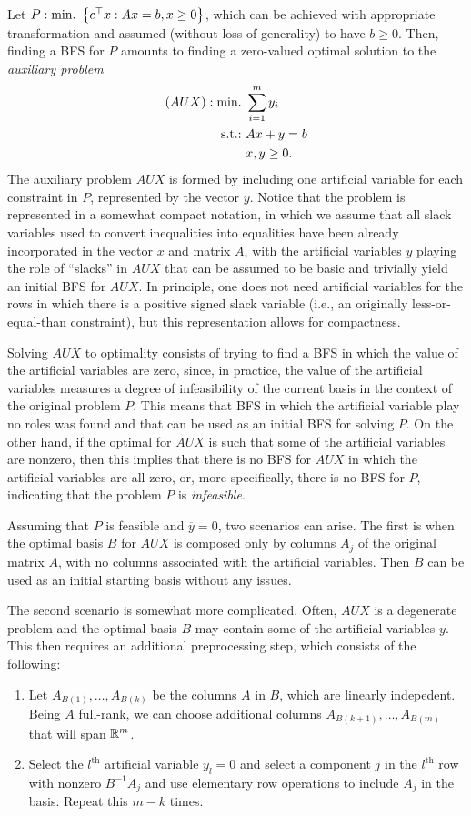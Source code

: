 Let $P : \mathop{\text{min.~}}\left\{ c^\top x : Ax = b, x \geq 0 \right \}$, which can be achieved with appropriate transformation and assumed (without loss of generality) to have $b \geq 0$. Then, finding a BFS for $P$ amounts to finding a zero-valued optimal solution to the \emph{auxiliary problem}
%
\begin{align*}
	(AUX) : \mathop{\text{min.~}} &\sum_{i=1}^m y_i \\
	\mathop{\text{s.t.:~}} & Ax + y = b \\
	    & x,y \geq 0.	
\end{align*}
%
The auxiliary problem $AUX$ is formed by including one artificial variable for each constraint in $P$, represented by the vector $y$. Notice that the problem is represented in a somewhat compact notation, in which we assume that all slack variables used to convert inequalities into equalities have been already incorporated in the vector $x$ and matrix $A$, with the artificial variables $y$ playing the role of ``slacks'' in $AUX$ that can be assumed to be basic and trivially yield an initial BFS for $AUX$. In principle, one does not need artificial variables for the rows in which there is a positive signed slack variable (i.e., an originally less-or-equal-than constraint), but this representation allows for compactness. 

Solving $AUX$ to optimality consists of trying to find a BFS in which the value of the artificial variables are zero, since, in practice, the value of the artificial variables measures a degree of infeasibility of the current basis in the context of the original problem $P$. This means that BFS in which the artificial variable play no roles was found and that can be used as an initial BFS for solving $P$. On the other hand, if the optimal for $AUX$ is such that some of the artificial variables are nonzero, then this implies that there is no BFS for $AUX$ in which the artificial variables are all zero, or, more specifically, there is no BFS for $P$, indicating that the problem $P$ is \emph{infeasible}.

Assuming that $P$ is feasible and $\overline{y}=0$, two scenarios can arise. The first is when the optimal basis $B$ for $AUX$ is composed only by columns $A_j$ of the original matrix $A$, with no columns associated with the artificial variables. Then $B$ can be used as an initial starting basis without any issues.

The second scenario is somewhat more complicated. Often, $AUX$ is a degenerate problem and the optimal basis $B$ may contain some of the artificial variables $y$. This then requires an additional preprocessing step, which consists of the following:
%
\begin{enumerate}
	\item Let $A_{B(1)}, \dots, A_{B(k)}$ be the columns $A$ in $B$, which are linearly indepedent. Being $A$ full-rank, we can choose additional columns $A_{B(k+1)}, \dots, A_{B(m)}$ that will span $\mathbb{R}^{m}$.
	\item Select the $l^{\text{th}}$ artificial variable $y_l=0$ and select a component $j$ in the $l^{\text{th}}$ row with nonzero $B^{-1}A_j$ and use elementary row operations to include $A_j$ in the basis. Repeat this $m-k$ times.
\end{enumerate}

